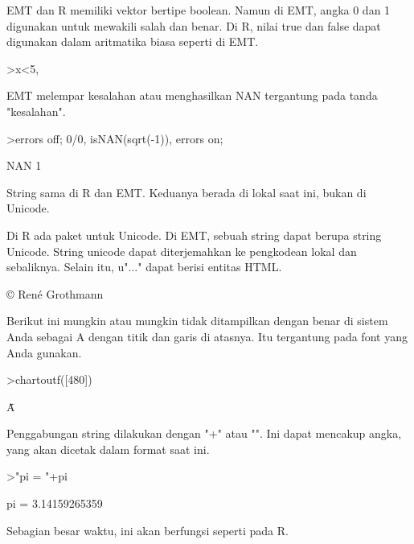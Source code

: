 \documentclass{article}
\begin{document}
\begin{eulernotebook}
\begin{eulercomment}
\begin{eulercomment}
\begin{eulercomment}
EMT dan R memiliki vektor bertipe boolean. Namun di EMT, angka 0 dan 1
digunakan untuk mewakili salah dan benar. Di R, nilai true dan false
dapat digunakan dalam aritmatika biasa seperti di EMT.
\end{eulercomment}
\begin{eulerprompt}
>x<5, %
\end{eulerprompt}
\begin{euleroutput}
  [0,  0,  1,  0,  0]
  [0,  0,  3.1,  0,  0]
\end{euleroutput}
\begin{eulercomment}
EMT melempar kesalahan atau menghasilkan NAN tergantung pada tanda
"kesalahan".
\end{eulercomment}
\begin{eulerprompt}
>errors off; 0/0, isNAN(sqrt(-1)), errors on;
\end{eulerprompt}
\begin{euleroutput}
  NAN
  1
\end{euleroutput}
\begin{eulercomment}
String sama di R dan EMT. Keduanya berada di lokal saat ini, bukan di
Unicode.

Di R ada paket untuk Unicode. Di EMT, sebuah string dapat berupa
string Unicode. String unicode dapat diterjemahkan ke pengkodean lokal
dan sebaliknya. Selain itu, u"..." dapat berisi entitas HTML.
\end{eulercomment}
\begin{euleroutput}
  © René Grothmann
\end{euleroutput}
\begin{eulercomment}
Berikut ini mungkin atau mungkin tidak ditampilkan dengan benar di
sistem Anda sebagai A dengan titik dan garis di atasnya. Itu
tergantung pada font yang Anda gunakan.
\end{eulercomment}
\begin{eulerprompt}
>chartoutf([480])
\end{eulerprompt}
\begin{euleroutput}
  Ǡ
\end{euleroutput}
\begin{eulercomment}
Penggabungan string dilakukan dengan "+" atau "\textbar{}". Ini dapat mencakup
angka, yang akan dicetak dalam format saat ini.
\end{eulercomment}
\begin{eulerprompt}
>"pi = "+pi
\end{eulerprompt}
\begin{euleroutput}
  pi = 3.14159265359
\end{euleroutput}
\begin{eulercomment}
Sebagian besar waktu, ini akan berfungsi seperti pada R.


\end{eulercomment}
\end{eulercomment}
\end{eulercomment}
\end{eulernotebook}
\end{document}
